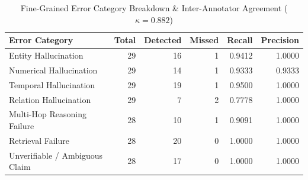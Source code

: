 \begin{table}[htbp]
\caption{Fine-Grained Error Category Breakdown & Inter-Annotator Agreement ($\kappa = 0.882$)}
\begin{center}
\begin{tabular}{lrrrrr}
\toprule
\textbf{Error Category} & \textbf{Total} & \textbf{Detected} & \textbf{Missed} & \textbf{Recall} & \textbf{Precision} \\
\midrule
Entity Hallucination & 29 & 16 & 1 & 0.9412 & 1.0000 \\
Numerical Hallucination & 29 & 14 & 1 & 0.9333 & 0.9333 \\
Temporal Hallucination & 29 & 19 & 1 & 0.9500 & 1.0000 \\
Relation Hallucination & 29 & 7 & 2 & 0.7778 & 1.0000 \\
Multi-Hop Reasoning Failure & 28 & 10 & 1 & 0.9091 & 1.0000 \\
Retrieval Failure & 28 & 20 & 0 & 1.0000 & 1.0000 \\
Unverifiable / Ambiguous Claim & 28 & 17 & 0 & 1.0000 & 1.0000 \\
\bottomrule
\end{tabular}
\label{tab:error_breakdown}
\end{center}
\end{table}